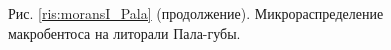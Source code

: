 \documentclass[12pt, a4paper]{disser}
\begin{document}
\begin{figure}[h]




%
%




	\begin{center}
	Рис. \ref{ris:moransI_Pala} (продолжение). Микрораспределение макробентоса на литорали Пала-губы.
	\end{center}

	\end{figure}
\end{document}
